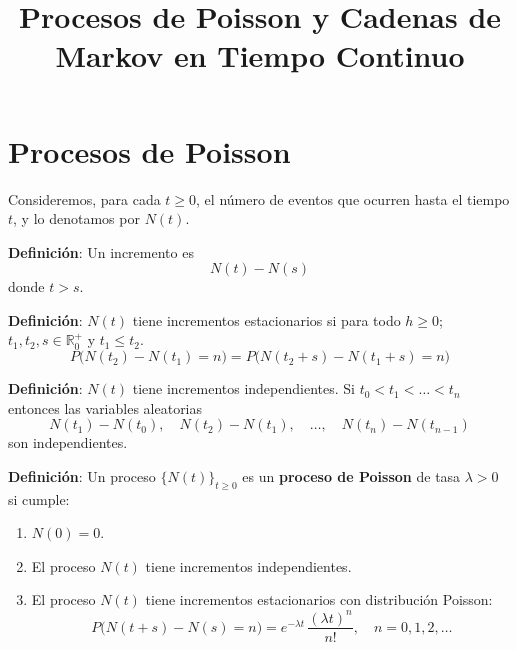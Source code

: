 \documentclass[12pt,a4paper]{article}
\title{Procesos de Poisson y Cadenas de Markov en Tiempo Continuo}
\author{}
\date{}
\newcommand{\definicion}[1]{%
\begin{definicionbox}
\textbf{Definición}: #1
\end{definicionbox}
}
\begin{document}
\maketitle

\section{Procesos de Poisson}

Consideremos, para cada $t \geq 0$, el número de eventos que ocurren hasta el tiempo $t$, y lo denotamos por $N(t)$.

\definicion{Un incremento es 
\begin{equation*}
N(t) - N(s)
\end{equation*}
donde $t > s$.}

\definicion{$N(t)$ tiene incrementos estacionarios si para todo $h \geq 0$; $t_1, t_2, s \in \mathbb{R}_{0}^+$ y $t_1 \leq t_{2}$.
\begin{equation*}
P\big(N(t_{2}) - N(t_{1}) = n\big) 
= P\big(N(t_{2}+s) - N(t_{1}+s) = n\big)
\end{equation*}}

\begin{center}
\end{center}

\definicion{$N(t)$ tiene incrementos independientes. Si $t_{0} < t_{1} < \dots < t_{n}$ entonces las variables aleatorias
\begin{equation*}
N(t_{1}) - N(t_{0}), \quad 
N(t_{2}) - N(t_{1}), \quad \dots, \quad 
N(t_{n}) - N(t_{n-1})
\end{equation*}
son independientes.}

\definicion{Un proceso $\{N(t)\}_{t \geq 0}$ es un \textbf{proceso de Poisson} de tasa $\lambda > 0$ si cumple:
\begin{enumerate}
    \item $N(0) = 0$.
    \item El proceso $N(t)$ tiene incrementos independientes.
    \item El proceso $N(t)$ tiene incrementos estacionarios con distribución Poisson:
    \begin{equation*}
    P\big(N(t+s) - N(s) = n\big) 
    = e^{-\lambda t} \, \frac{(\lambda t)^n}{n!}, 
    \quad n = 0,1,2,\dots
    \end{equation*}
\end{enumerate}}
\end{document}
